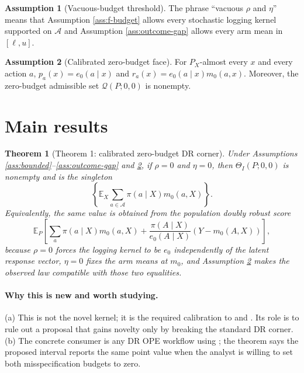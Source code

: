 \documentclass[11pt]{article}
\newcommand{\E}{\mathbb{E}}
\theoremstyle{definition}
\newtheorem{assumption}{Assumption}
\theoremstyle{plain}
\newtheorem{theorem}{Theorem}
\theoremstyle{remark}
\begin{document}
\begin{assumption}[Vacuous-budget threshold]\label{ass:vacuous}
The phrase ``vacuous $\rho$ and $\eta$'' means that Assumption \ref{ass:f-budget} allows every stochastic logging kernel supported on $\mathcal A$ and Assumption \ref{ass:outcome-gap} allows every arm mean in $[\ell,u]$.
\end{assumption}

\begin{assumption}[Calibrated zero-budget face]\label{ass:zero-calibrated}
For $P_X$-almost every $x$ and every action $a$, $p_a(x)=e_0(a\mid x)$ and $r_a(x)=e_0(a\mid x)m_0(a,x)$. Moreover, the zero-budget admissible set $\mathcal Q(P;0,0)$ is nonempty.
\end{assumption}

\section{Main results}
\begin{theorem}[Theorem 1: calibrated zero-budget DR corner]\label{thm:dr-corner}
Under Assumptions \ref{ass:bounded}--\ref{ass:outcome-gap} and \ref{ass:zero-calibrated}, if $\rho=0$ and $\eta=0$, then $\Theta_I(P;0,0)$ is nonempty and is the singleton
\[
  \left\{\E_X\sum_{a\in\mathcal A}\pi(a\mid X)m_0(a,X)\right\}.
\]
Equivalently, the same value is obtained from the population doubly robust score
\[
  \E_P\left[\sum_a \pi(a\mid X)m_0(a,X)
        +\frac{\pi(A\mid X)}{e_0(A\mid X)}(Y-m_0(A,X))\right],
\]
because $\rho=0$ forces the logging kernel to be $e_0$ independently of the latent response vector, $\eta=0$ fixes the arm means at $m_0$, and Assumption \ref{ass:zero-calibrated} makes the observed law compatible with those two equalities.
\end{theorem}
\paragraph{Why this is new and worth studying.}
(a) This is not the novel kernel; it is the required calibration to \citet{DudikLangfordLi2011} and \citet{WangAgarwalDudik2017}. Its role is to rule out a proposal that gains novelty only by breaking the standard DR corner. (b) The concrete consumer is any DR OPE workflow using \citet{DudikLangfordLi2011}; the theorem says the proposed interval reports the same point value when the analyst is willing to set both misspecification budgets to zero.
\end{document}
